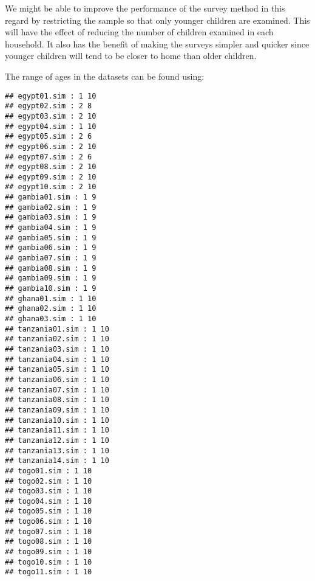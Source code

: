 \documentclass[
  12pt,
  a4paper]{book}
\newenvironment{Shaded}{\begin{snugshade}}{\end{snugshade}}
\newcommand{\AttributeTok}[1]{\textcolor[rgb]{0.77,0.63,0.00}{#1}}
\newcommand{\ConstantTok}[1]{\textcolor[rgb]{0.00,0.00,0.00}{#1}}
\newcommand{\ControlFlowTok}[1]{\textcolor[rgb]{0.13,0.29,0.53}{\textbf{#1}}}
\newcommand{\FunctionTok}[1]{\textcolor[rgb]{0.00,0.00,0.00}{#1}}
\newcommand{\NormalTok}[1]{#1}
\newcommand{\OtherTok}[1]{\textcolor[rgb]{0.56,0.35,0.01}{#1}}
\newcommand{\SpecialCharTok}[1]{\textcolor[rgb]{0.00,0.00,0.00}{#1}}
\newcommand{\StringTok}[1]{\textcolor[rgb]{0.31,0.60,0.02}{#1}}
\begin{document}
We might be able to improve the performance of the survey method in this regard by restricting the sample so that only younger children are examined. This will have the effect of reducing the number of children examined in each household. It also has the benefit of making the surveys simpler and quicker since younger children will tend to be closer to home than older children.

The range of ages in the datasets can be found using:

\begin{Shaded}
\end{Shaded}

\begin{verbatim}
## egypt01.sim : 1 10 
## egypt02.sim : 2 8 
## egypt03.sim : 2 10 
## egypt04.sim : 1 10 
## egypt05.sim : 2 6 
## egypt06.sim : 2 10 
## egypt07.sim : 2 6 
## egypt08.sim : 2 10 
## egypt09.sim : 2 10 
## egypt10.sim : 2 10 
## gambia01.sim : 1 9 
## gambia02.sim : 1 9 
## gambia03.sim : 1 9 
## gambia04.sim : 1 9 
## gambia05.sim : 1 9 
## gambia06.sim : 1 9 
## gambia07.sim : 1 9 
## gambia08.sim : 1 9 
## gambia09.sim : 1 9 
## gambia10.sim : 1 9 
## ghana01.sim : 1 10 
## ghana02.sim : 1 10 
## ghana03.sim : 1 10 
## tanzania01.sim : 1 10 
## tanzania02.sim : 1 10 
## tanzania03.sim : 1 10 
## tanzania04.sim : 1 10 
## tanzania05.sim : 1 10 
## tanzania06.sim : 1 10 
## tanzania07.sim : 1 10 
## tanzania08.sim : 1 10 
## tanzania09.sim : 1 10 
## tanzania10.sim : 1 10 
## tanzania11.sim : 1 10 
## tanzania12.sim : 1 10 
## tanzania13.sim : 1 10 
## tanzania14.sim : 1 10 
## togo01.sim : 1 10 
## togo02.sim : 1 10 
## togo03.sim : 1 10 
## togo04.sim : 1 10 
## togo05.sim : 1 10 
## togo06.sim : 1 10 
## togo07.sim : 1 10 
## togo08.sim : 1 10 
## togo09.sim : 1 10 
## togo10.sim : 1 10 
## togo11.sim : 1 10
\end{verbatim}
\end{document}
